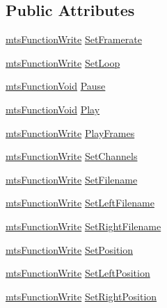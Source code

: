 \subsection*{Public Attributes}
\begin{DoxyCompactItemize}
\item 
\hyperlink{classmts_function_write}{mts\+Function\+Write} \hyperlink{class_i_req_filter_source_video_file_a96c23fb93b4bd2edee6c76811abdce66}{Set\+Framerate}
\item 
\hyperlink{classmts_function_write}{mts\+Function\+Write} \hyperlink{class_i_req_filter_source_video_file_af4f7763123ecd5a66edccc5e43b8e08e}{Set\+Loop}
\item 
\hyperlink{classmts_function_void}{mts\+Function\+Void} \hyperlink{class_i_req_filter_source_video_file_af210b57e7d5e22a3375e6cd082caaf97}{Pause}
\item 
\hyperlink{classmts_function_void}{mts\+Function\+Void} \hyperlink{class_i_req_filter_source_video_file_a235bca8cf38c48322edb1209b0c0f0fc}{Play}
\item 
\hyperlink{classmts_function_write}{mts\+Function\+Write} \hyperlink{class_i_req_filter_source_video_file_a0f0b0ba0aa55c40882a5b73181fb4b2f}{Play\+Frames}
\item 
\hyperlink{classmts_function_write}{mts\+Function\+Write} \hyperlink{class_i_req_filter_source_video_file_a1ac352d3e583b8eb2298bb40cee04f1a}{Set\+Channels}
\item 
\hyperlink{classmts_function_write}{mts\+Function\+Write} \hyperlink{class_i_req_filter_source_video_file_ac5769880cb2ebf714d2d645eebf74fbd}{Set\+Filename}
\item 
\hyperlink{classmts_function_write}{mts\+Function\+Write} \hyperlink{class_i_req_filter_source_video_file_a2f00d1dbc4ced344f5015a81dce5e11b}{Set\+Left\+Filename}
\item 
\hyperlink{classmts_function_write}{mts\+Function\+Write} \hyperlink{class_i_req_filter_source_video_file_a96cb4f97ea9bed7c68b2faf9aedec210}{Set\+Right\+Filename}
\item 
\hyperlink{classmts_function_write}{mts\+Function\+Write} \hyperlink{class_i_req_filter_source_video_file_a975749712b4d2563c6a119e3dba3efc2}{Set\+Position}
\item 
\hyperlink{classmts_function_write}{mts\+Function\+Write} \hyperlink{class_i_req_filter_source_video_file_a262ebe15b7028a6a067f6dfda502b8fe}{Set\+Left\+Position}
\item 
\hyperlink{classmts_function_write}{mts\+Function\+Write} \hyperlink{class_i_req_filter_source_video_file_a684875f3ca7a3080dc0f033dec576fa3}{Set\+Right\+Position}

\end{DoxyCompactItemize}

